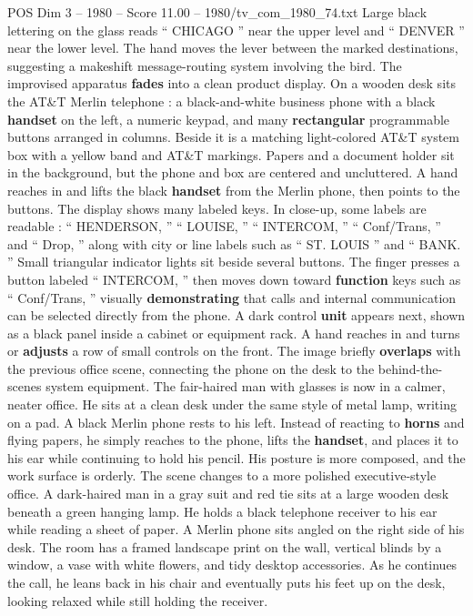 \begin{textsample}{POS Dim 3 – 1980 – Score 11.00 – 1980/tv\_com\_1980\_74.txt}
Large black lettering on the glass reads “ CHICAGO ” near the upper level and “ DENVER ” near the lower level.
The hand moves the lever between the marked destinations, suggesting a makeshift message-routing system involving the bird.
The improvised apparatus \textbf{fades} into a clean product display.
On a wooden desk sits the AT\&T Merlin telephone : a black-and-white business phone with a black \textbf{handset} on the left, a numeric keypad, and many \textbf{rectangular} programmable buttons arranged in columns.
Beside it is a matching light-colored AT\&T system box with a yellow band and AT\&T markings.
Papers and a document holder sit in the background, but the phone and box are centered and uncluttered.
A hand reaches in and lifts the black \textbf{handset} from the Merlin phone, then points to the buttons.
The display shows many labeled keys.
In close-up, some labels are readable : “ HENDERSON, ” “ LOUISE, ” “ INTERCOM, ” “ Conf/Trans, ” and “ Drop, ” along with city or line labels such as “ ST.
LOUIS ” and “ BANK. ” Small triangular indicator lights sit beside several buttons.
The finger presses a button labeled “ INTERCOM, ” then moves down toward \textbf{function} keys such as “ Conf/Trans, ” visually \textbf{demonstrating} that calls and internal communication can be selected directly from the phone.
A dark control \textbf{unit} appears next, shown as a black panel inside a cabinet or equipment rack.
A hand reaches in and turns or \textbf{adjusts} a row of small controls on the front.
The image briefly \textbf{overlaps} with the previous office scene, connecting the phone on the desk to the behind-the-scenes system equipment.
The fair-haired man with glasses is now in a calmer, neater office.
He sits at a clean desk under the same style of metal lamp, writing on a pad.
A black Merlin phone rests to his left.
Instead of reacting to \textbf{horns} and flying papers, he simply reaches to the phone, lifts the \textbf{handset}, and places it to his ear while continuing to hold his pencil.
His posture is more composed, and the work surface is orderly.
The scene changes to a more polished executive-style office.
A dark-haired man in a gray suit and red tie sits at a large wooden desk beneath a green hanging lamp.
He holds a black telephone receiver to his ear while reading a sheet of paper.
A Merlin phone sits angled on the right side of his desk.
The room has a framed landscape print on the wall, vertical blinds by a window, a vase with white flowers, and tidy desktop accessories.
As he continues the call, he leans back in his chair and eventually puts his feet up on the desk, looking relaxed while still holding the receiver.

\end{textsample}
